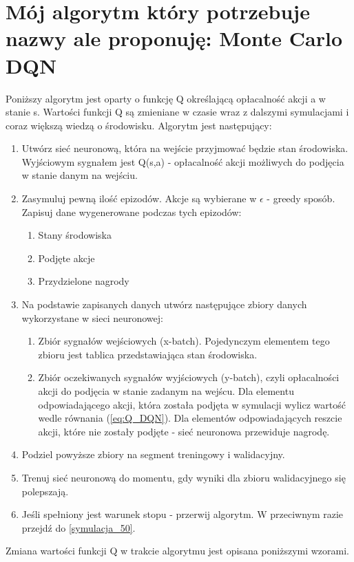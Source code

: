 \documentclass[12pt]{book}
\theoremstyle{plain}
\newcommand{\myref}[1]{(\ref{#1})}
\begin{document}
\section{Mój algorytm który potrzebuje nazwy ale proponuję: Monte Carlo DQN} \label{learning:DQN_single_agent}
Poniższy algorytm jest oparty o funkcję Q określającą opłacalność akcji a w stanie s. Wartości funkcji Q są zmieniane w czasie wraz z dalszymi symulacjami i coraz większą wiedzą o środowisku. Algorytm jest następujący:
\begin{enumerate}
	\item Utwórz sieć neuronową, która na wejście przyjmować będzie stan środowiska. Wyjściowym sygnałem jest Q(s,a) - opłacalność akcji możliwych do podjęcia w stanie danym na wejściu.
	\item Zasymuluj pewną ilość epizodów. Akcje są wybierane w $\epsilon$ - greedy sposób. Zapisuj dane wygenerowane podczas tych epizodów: \label{symulacja_50}
	\begin{enumerate}
		\item Stany środowiska
		\item Podjęte akcje
		\item Przydzielone nagrody
	\end{enumerate}
	\item Na podstawie zapisanych danych utwórz następujące zbiory danych wykorzystane w sieci neuronowej:
	\begin{enumerate}
		\item Zbiór sygnałów wejściowych (x-batch). Pojedynczym elementem tego zbioru jest tablica przedstawiająca stan środowiska.
		\item Zbiór oczekiwanych sygnałów wyjściowych (y-batch), czyli opłacalności akcji do podjęcia w stanie zadanym na wejścu.
		Dla elementu odpowiadającego akcji, która została podjęta w symulacji wylicz wartość wedle równania \myref{eq:Q_DQN}. Dla elementów odpowiadających reszcie akcji, które nie zostały podjęte - sieć neuronowa przewiduje nagrodę. 
	\end{enumerate}
	\item Podziel powyższe zbiory na segment treningowy i walidacyjny.
	\item Trenuj sieć neuronową do momentu, gdy wyniki dla zbioru walidacyjnego się polepszają.
	\item Jeśli spełniony jest warunek stopu - przerwij algorytm. W przeciwnym razie przejdź do \ref{symulacja_50}.
	
\end{enumerate}
Zmiana wartości funkcji Q w trakcie algorytmu jest opisana poniższymi wzorami.
\end{document}
